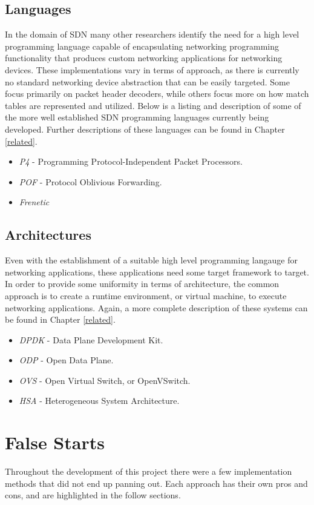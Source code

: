 \subsection{Languages}
In the domain of SDN many other researchers identify the need for a high level
programming language capable of encapsulating networking programming 
functionality that produces custom networking applications for networking 
devices. These implementations vary in terms of approach, as there is currently
no standard networking device abstraction that can be easily targeted. Some 
focus primarily on packet header decoders, while others focus more on how match
tables are represented and utilized. Below is a listing and description of 
some of the more well established SDN programming languages currently being
developed. Further descriptions of these languages can be found in Chapter \ref{related}.
\begin{itemize}
\item \emph{P4} - Programming Protocol-Independent Packet Processors.
\item \emph{POF} - Protocol Oblivious Forwarding.
\item \emph{Frenetic}
\end{itemize}

\subsection{Architectures}
Even with the establishment of a suitable high level programming langauge for
networking applications, these applications need some target framework to 
target. In order to provide some uniformity in terms of architecture, the 
common approach is to create a runtime environment, or virtual machine, to 
execute networking applications. Again, a more complete description of these
systems can be found in Chapter \ref{related}.
\begin{itemize}
\item \emph{DPDK} - Data Plane Development Kit.
\item \emph{ODP} - Open Data Plane.
\item \emph{OVS} - Open Virtual Switch, or OpenVSwitch.
\item \emph{HSA} - Heterogeneous System Architecture.
\end{itemize}

\section{False Starts}
Throughout the development of this project there were a few implementation
methods that did not end up panning out. Each approach has their own pros
and cons, and are highlighted in the follow sections.

